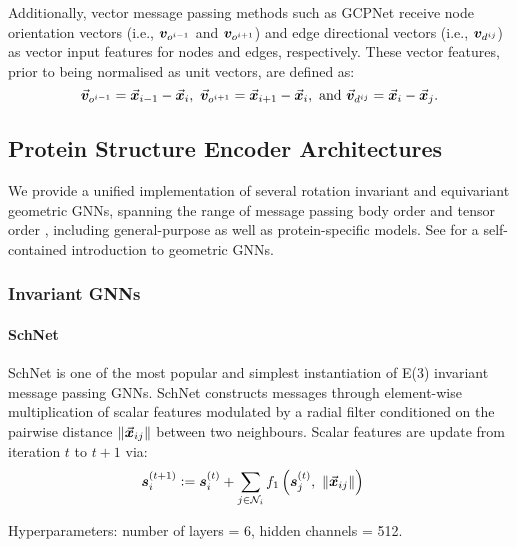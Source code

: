Additionally, vector message passing methods such as GCPNet receive node orientation vectors (i.e., ${\bm{v}}_{o^{i - 1}}$ and ${\bm{v}}_{o^{i + 1}}$) and edge directional vectors (i.e., ${\bm{v}}_{d^{ij}}$) as vector input features for nodes and edges, respectively. These vector features, prior to being normalised as unit vectors, are defined as:
\begin{equation}
    \vec{{\bm{v}}}_{o^{i - 1}} = \vec{{\bm{x}}}_{i - 1} - \vec{{\bm{x}}}_{i}, \ \vec{{\bm{v}}}_{o^{i + 1}} = \vec{{\bm{x}}}_{i + 1} - \vec{{\bm{x}}}_{i}, \mbox{ and } \vec{{\bm{v}}}_{d^{ij}} = \vec{{\bm{x}}}_{i} - \vec{{\bm{x}}}_{j}.
\end{equation}


\subsection{Protein Structure Encoder Architectures}
\label{app:gnns}

We provide a unified implementation of several rotation invariant and equivariant geometric GNNs, spanning the range of message passing body order and tensor order \citep{joshi2023expressive}, including general-purpose as well as protein-specific models.
See \citet{duval2023hitchhiker} for a self-contained introduction to geometric GNNs.

\subsubsection{Invariant GNNs}

\paragraph{SchNet \citep{schutt2018schnet}} SchNet is one of the most popular and simplest instantiation of E(3) invariant message passing GNNs. SchNet constructs messages through element-wise multiplication of scalar features modulated by a radial filter conditioned on the pairwise distance $\Vert \vec{{\bm{x}}}_{ij} \Vert$ between two neighbours.
Scalar features are update from iteration $t$ to $t+1$ via:
\begin{align}
    {\bm{s}}_i^{(t+1)} & \vcentcolon= {\bm{s}}_i^{(t)} + \sum_{j \in \mathcal{N}_i} f_1 \left( {\bm{s}}_j^{(t)} , \ \Vert \vec{{\bm{x}}}_{ij} \Vert \right) \label{eq:schnet}
\end{align}

Hyperparameters: number of layers = 6, hidden channels = 512.

